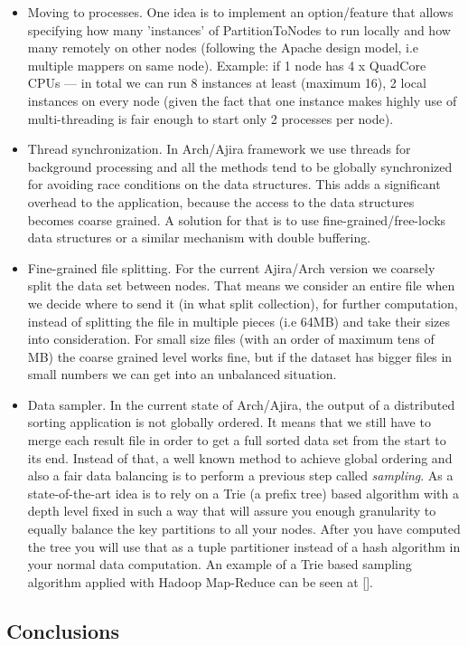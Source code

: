 \begin{itemize}
	\item Moving to processes. One idea is to implement an option/feature that allows specifying how many 'instances' of PartitionToNodes to run locally and how many remotely on other nodes (following the Apache design model, i.e multiple mappers on same node). Example: if 1 node has 4 x QuadCore CPUs --- in total we can run 8 instances at least (maximum 16), 2 local instances on every node (given the fact that one instance makes highly use of multi-threading is fair enough to start only 2 processes per node).
	\item Thread synchronization. In Arch/Ajira framework we use threads for background processing and all the methods tend to be globally synchronized for avoiding race conditions on the data structures. This adds a significant overhead to the application, because the access to the data structures becomes coarse grained. A solution for that is to use fine-grained/free-locks data structures or a similar mechanism with double buffering. 
	\item Fine-grained file splitting. For the current Ajira/Arch version we coarsely split the data set between nodes. That means we consider an entire file when we decide where to send it (in what split collection), for further computation, instead of splitting the file in multiple pieces (i.e 64MB) and take their sizes into consideration. For small size files (with an order of maximum tens of MB) the coarse grained level works fine, but if the dataset has bigger files in small numbers we can get into an unbalanced situation.
	\item Data sampler. In the current state of Arch/Ajira, the output of a distributed sorting application is not globally ordered. It means that we still have to merge each result file in order to get a full sorted data set from the start to its end. Instead of that, a well known method to achieve global ordering and also a fair data balancing is to perform a previous step called \textit{sampling}. As a state-of-the-art idea is to rely on a Trie (a prefix tree) based algorithm with a depth level fixed in such a way that will assure you enough granularity to equally balance the key partitions to all your nodes. After you have computed the tree you will use that as a tuple partitioner instead of a hash algorithm in your normal data computation. An example of a Trie based sampling algorithm applied with Hadoop Map-Reduce can be seen at [].
\end{itemize}

\subsection{Conclusions}
